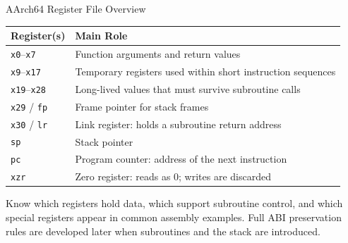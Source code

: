 \documentclass[aspectratio=169,11pt,t,xcolor=table]{beamer}
\newcommand{\bits}[1]{\texttt{#1}}
\begin{document}
\begin{frame}{AArch64 Register File Overview}
\vfill
\begin{center}
\small
\renewcommand{\arraystretch}{1.08}
\setlength{\tabcolsep}{6pt}
\begin{tabular}{ll}
\toprule
\textbf{Register(s)} & \textbf{Main Role} \\
\midrule
\rowcolor{tablerow}
\bits{x0}--\bits{x7}   & Function arguments and return values \\
\bits{x9}--\bits{x17}  & Temporary registers used within short instruction sequences \\
\rowcolor{tablerow}
\bits{x19}--\bits{x28} & Long-lived values that must survive subroutine calls \\
\bits{x29} / \bits{fp} & Frame pointer for stack frames \\
\rowcolor{tablerow}
\bits{x30} / \bits{lr} & Link register: holds a subroutine return address \\
\bits{sp}              & Stack pointer \\
\rowcolor{tablerow}
\bits{pc}              & Program counter: address of the next instruction \\
\bits{xzr}             & Zero register: reads as 0; writes are discarded \\
\bottomrule
\end{tabular}
\end{center}

\vfill
\small
Know which registers hold data, which support subroutine control, and which special registers appear in common assembly examples. Full ABI preservation rules are developed later when subroutines and the stack are introduced.
\vfill
\end{frame}









\end{document}
